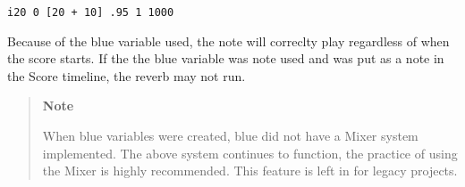 \begin{verbatim}
i20 0 [20 + 10] .95 1 1000
\end{verbatim}

Because of the blue variable used, the note will correclty play
regardless of when the score starts. If the the blue variable was note
used and was put as a note in the Score timeline, the reverb may not
run.

\begin{quote}
\textbf{Note}

When blue variables were created, blue did not have a Mixer system
implemented. The above system continues to function, the practice of
using the Mixer is highly recommended. This feature is left in for
legacy projects.
\end{quote}
